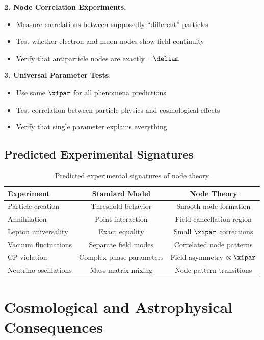 	\textbf{2. Node Correlation Experiments}:
	\begin{itemize}
		\item Measure correlations between supposedly ``different'' particles
		\item Test whether electron and muon nodes show field continuity
		\item Verify that antiparticle nodes are exactly $-\deltam$
	\end{itemize}
	
	\textbf{3. Universal Parameter Tests}:
	\begin{itemize}
		\item Use same $\xipar$ for all phenomena predictions
		\item Test correlation between particle physics and cosmological effects
		\item Verify that single parameter explains everything
	\end{itemize}
	
	\subsection{Predicted Experimental Signatures}
	
	\begin{table}[htbp]
		\centering
		\begin{tabular}{lcc}
			\toprule
			\textbf{Experiment} & \textbf{Standard Model} & \textbf{Node Theory} \\
			\midrule
			Particle creation & Threshold behavior & Smooth node formation \\
			Annihilation & Point interaction & Field cancellation region \\
			Lepton universality & Exact equality & Small $\xipar$ corrections \\
			Vacuum fluctuations & Separate field modes & Correlated node patterns \\
			CP violation & Complex phase parameters & Field asymmetry $\propto \xipar$ \\
			Neutrino oscillations & Mass matrix mixing & Node pattern transitions \\
			\bottomrule
		\end{tabular}
		\caption{Predicted experimental signatures of node theory}
		\label{tab:experimental_signatures}
	\end{table}
	
	\section{Cosmological and Astrophysical Consequences}
	

